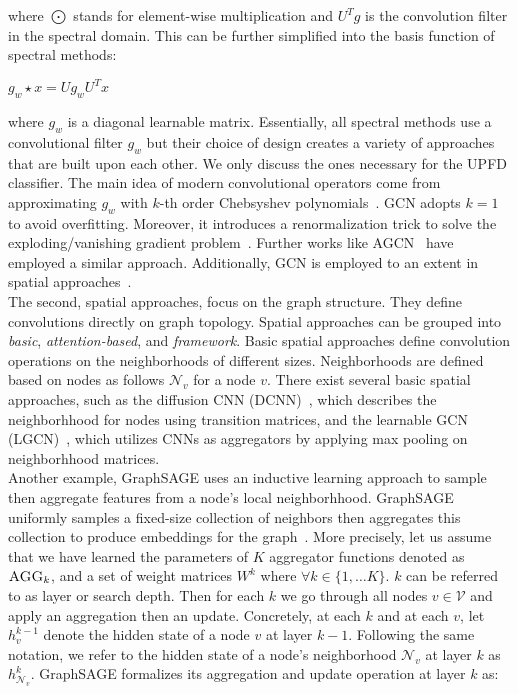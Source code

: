 where $\bigodot$ stands for element-wise multiplication and $U^Tg$ is the convolution filter in the spectral domain. This can be further simplified into the basis function of spectral methods:
\begin{center}
    $g_w \star x = U g_w U^T x$
\end{center}
where $g_w$ is a diagonal learnable matrix. Essentially, all spectral methods use a convolutional filter $g_w$ but their choice of design creates a variety of approaches that are built upon each other. We only discuss the ones necessary for the UPFD classifier. The main idea of modern convolutional operators come from approximating $g_w$ with $k$-th order Chebsyshev polynomials~\parencite{GNNsAReview_Zhou}. GCN adopts $k=1$ to avoid overfitting. Moreover, it introduces a renormalization trick to solve the exploding/vanishing gradient problem~\parencite{GCN_Kipf}. Further works like AGCN~\parencite{AGCN_Li} have employed a similar approach. Additionally, GCN is employed to an extent in spatial approaches~\parencite{GNNsAReview_Zhou}.\\
The second, spatial approaches, focus on the graph structure. They define convolutions directly on graph topology. Spatial approaches can be grouped into \emph{basic}, \emph{attention-based}, and \emph{framework}. Basic spatial approaches define convolution operations on the neighborhoods of different sizes. Neighborhoods are defined based on nodes as follows $\mathcal{N}_v$ for a node $v$. There exist several basic spatial approaches, such as the diffusion CNN (DCNN)~\parencite{DCNN_Atwood}, which describes the neighborhhood for nodes using transition matrices, and the learnable GCN (LGCN)~\parencite{LGCN_Gao}, which utilizes CNNs as aggregators by applying max pooling on neighborhhood matrices.\\
Another example, GraphSAGE uses an inductive learning approach to sample then aggregate features from a node's local neighborhhood. GraphSAGE uniformly samples a fixed-size collection of neighbors then aggregates this collection to produce embeddings for the graph~\parencite{GraphSAGE_Hamilton}. More precisely, let us assume that we have learned the parameters of $K$ aggregator functions denoted as $\textsc{AGG}_k$, and a set of weight matrices $W^k$ where $\forall k \in \{1, \dots K\}$. $k$ can be referred to as layer or search depth. Then for each $k$ we go through all nodes $v \in \mathcal{V}$ and apply an aggregation then an update. Concretely, at each $k$ and at each $v$, let $h_v^{k-1}$ denote the hidden state of a node $v$ at layer $k-1$. Following the same notation, we refer to the hidden state of a node's neighborhood $\mathcal{N}_v$ at layer $k$ as $h_{\mathcal{N}_v}^k$. GraphSAGE formalizes its aggregation and update operation at layer $k$ as:
